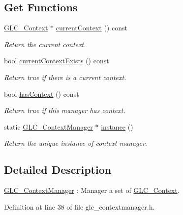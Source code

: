 \subsection*{Get Functions}
\begin{DoxyCompactItemize}
\item 
\hyperlink{class_g_l_c___context}{G\-L\-C\-\_\-\-Context} $\ast$ \hyperlink{class_g_l_c___context_manager_a7d6f02a2d12ef9a9d87088bef7164f51}{current\-Context} () const 
\begin{DoxyCompactList}\small\item\em Return the current context. \end{DoxyCompactList}\item 
bool \hyperlink{class_g_l_c___context_manager_ab81949f40615c17f2bd7be5b8059bd71}{current\-Context\-Exists} () const 
\begin{DoxyCompactList}\small\item\em Return true if there is a current context. \end{DoxyCompactList}\item 
bool \hyperlink{class_g_l_c___context_manager_a9940da1a9265f1a7b3ff6d9b0499aefb}{has\-Context} () const 
\begin{DoxyCompactList}\small\item\em Return true if this manager has context. \end{DoxyCompactList}\item 
static \hyperlink{class_g_l_c___context_manager}{G\-L\-C\-\_\-\-Context\-Manager} $\ast$ \hyperlink{class_g_l_c___context_manager_aca70f0a74d1d31ee3af4765a6d5d554a}{instance} ()
\begin{DoxyCompactList}\small\item\em Return the unique instance of context manager. \end{DoxyCompactList}\end{DoxyCompactItemize}


\subsection{Detailed Description}
\hyperlink{class_g_l_c___context_manager}{G\-L\-C\-\_\-\-Context\-Manager} \-: Manager a set of \hyperlink{class_g_l_c___context}{G\-L\-C\-\_\-\-Context}. 

Definition at line 38 of file glc\-\_\-contextmanager.\-h.




